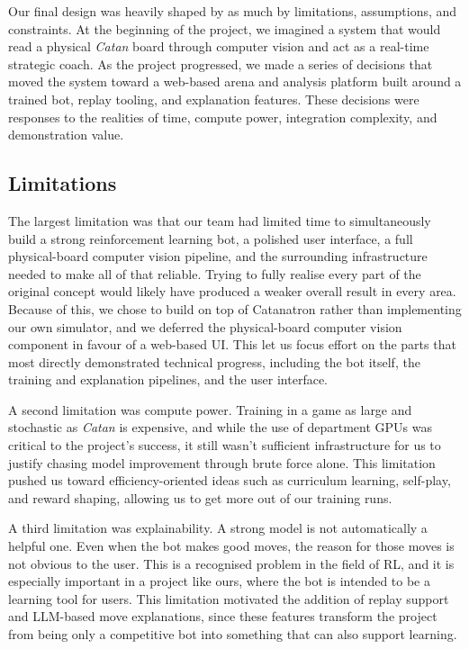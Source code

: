 \documentclass{article}
\begin{document}
Our final design was heavily shaped by as much by limitations, assumptions, and constraints.
At the beginning of the project, we imagined a system that would read a physical \emph{Catan} board through
computer vision and act as a real-time strategic coach.
As the project progressed, we made a series of decisions that moved the system toward a web-based arena and
analysis platform built around a trained bot, replay tooling, and explanation features.
These decisions were responses to the realities of time, compute power, integration complexity, and
demonstration value.

\subsection{Limitations}

The largest limitation was that our team had limited time to simultaneously build a strong reinforcement
learning bot, a polished user interface, a full physical-board computer vision pipeline, and the surrounding
infrastructure needed to make all of that reliable.
Trying to fully realise every part of the original concept would likely have produced a weaker overall result
in every area.
Because of this, we chose to build on top of Catanatron rather than implementing our own simulator, and we deferred
the physical-board computer vision component in favour of a web-based UI.
This let us focus effort on the parts that most directly demonstrated technical progress, including the
bot itself, the training and explanation pipelines, and the user interface.

A second limitation was compute power.
Training in a game as large and stochastic as \emph{Catan} is expensive, and while the use of department GPUs
was critical to the project's success, it still wasn't sufficient infrastructure for us to justify chasing
model improvement through brute force alone.
This limitation pushed us toward efficiency-oriented ideas such as curriculum learning, self-play, and
reward shaping, allowing us to get more out of our training runs.

A third limitation was explainability.
A strong model is not automatically a helpful one.
Even when the bot makes good moves, the reason for those moves is not obvious to the user.
This is a recognised problem in the field of RL, and it is especially important in a project like ours,
where the bot is intended to be a learning tool for users.
This limitation motivated the addition of replay support and LLM-based move explanations,
since these features transform the project from being only a competitive bot into something
that can also support learning.
\end{document}
